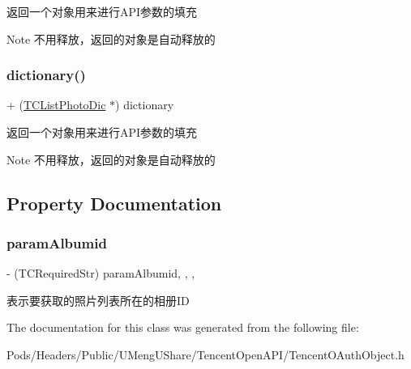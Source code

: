 返回一个对象用来进行\+A\+P\+I参数的填充

\begin{DoxyNote}{Note}
不用释放，返回的对象是自动释放的 
\end{DoxyNote}
\mbox{\label{interface_t_c_list_photo_dic_ac2269339e26ec904e2d34d5ffda87b6f}} 
\subsubsection{\texorpdfstring{dictionary()}{dictionary()}\hspace{0.1cm}{\footnotesize\ttfamily [2/2]}}
{\footnotesize\ttfamily + (\mbox{\hyperlink{interface_t_c_list_photo_dic}{T\+C\+List\+Photo\+Dic}} $\ast$) dictionary \begin{DoxyParamCaption}{ }\end{DoxyParamCaption}}

返回一个对象用来进行\+A\+P\+I参数的填充

\begin{DoxyNote}{Note}
不用释放，返回的对象是自动释放的 
\end{DoxyNote}


\subsection{Property Documentation}
\mbox{\label{interface_t_c_list_photo_dic_a73beb6a8b3b5674cd1f94ba349bcf02b}} 
\subsubsection{\texorpdfstring{param\+Albumid}{paramAlbumid}}
{\footnotesize\ttfamily -\/ (T\+C\+Required\+Str) param\+Albumid\hspace{0.3cm}{\ttfamily [read]}, {\ttfamily [write]}, {\ttfamily [nonatomic]}, {\ttfamily [retain]}}

表示要获取的照片列表所在的相册\+ID 

The documentation for this class was generated from the following file\+:\begin{DoxyCompactItemize}
\item 
Pods/\+Headers/\+Public/\+U\+Meng\+U\+Share/\+Tencent\+Open\+A\+P\+I/Tencent\+O\+Auth\+Object.\+h\end{DoxyCompactItemize}
